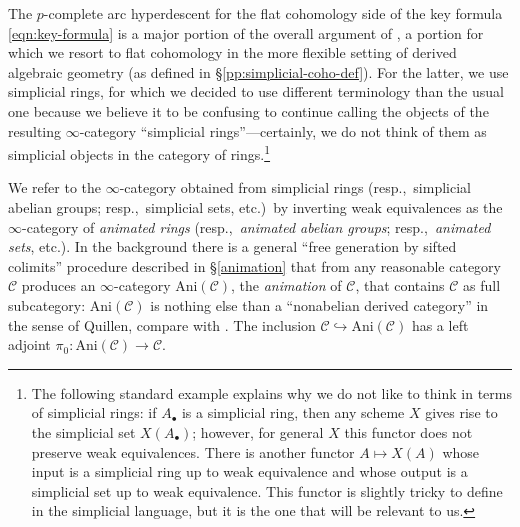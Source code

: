 \documentclass[11pt, reqno]{amsart}
\newcommand{\sC}{\mathscr{C}}
\numberwithin{equation}{numberingbase}
\theoremstyle{thms}
\theoremstyle{claims}
\theoremstyle{defs}
\theoremstyle{thms}
\theoremstyle{defs}
\theoremstyle{subsection-tweak}
\theoremstyle{subsection-tweak}
\begin{document}
The $p$-complete arc hyperdescent for the flat cohomology side of the key formula \eqref{eqn:key-formula}  is a major portion of the overall argument of , a portion for which we resort to flat cohomology in the more flexible setting of derived algebraic geometry (as defined in \S\ref{pp:simplicial-coho-def}). For the latter, we use simplicial rings, for which 
we decided to use %
different terminology than the usual one because we believe it to be confusing to continue calling  the objects of the resulting $\infty$-category ``simplicial rings''---certainly, we do not think of them as simplicial objects in the category of rings.\footnote{The following standard example explains why we do not like to think in terms of simplicial rings: if $A_\bullet$ is a simplicial ring, then any scheme $X$ gives rise to the simplicial set $X(A_\bullet)$; however, for general $X$ this functor does not preserve weak equivalences. There is another functor $A\mapsto X(A)$ whose input is a simplicial ring up to weak equivalence and whose output is a simplicial set up to weak equivalence. This functor is slightly tricky to define in the simplicial language, but it is the one that will be relevant to us.}

We refer to the $\infty$-category obtained from simplicial rings (resp.,~simplicial abelian groups; resp.,~simplicial sets, etc.)~by inverting weak equivalences as the $\infty$-category of \emph{animated rings} (resp.,~\emph{animated abelian groups}; resp.,~\emph{animated sets}, etc.). In the background there is a general ``free generation by sifted colimits'' procedure described in \S\ref{animation} that from any reasonable category $\sC$ produces an $\infty$-category $\mathrm{Ani}(\sC)$, the \emph{animation} of $\sC$, that contains $\sC$ as full subcategory: $\mathrm{Ani}(\sC)$ is nothing else than a ``nonabelian derived category'' in the sense of Quillen, compare with \cite[Section 5.5.8]{HTT}. The inclusion $\sC\hookrightarrow \mathrm{Ani}(\sC)$ has a left adjoint $\pi_0\colon \mathrm{Ani}(\sC)\to \sC$.
\end{document}
